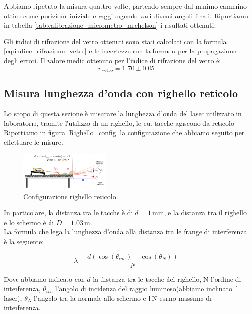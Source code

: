 \documentclass[letterpaper,12pt]{article}
\begin{document}
Abbiamo ripetuto la misura quattro volte, partendo sempre dal minimo cammino ottico come posizione iniziale
e raggiungendo vari diversi angoli finali. Riportiamo in tabella \ref{tab:calibrazione_micrometro_michelson} i risultati ottenuti:


Gli indici di rifrazione del vetro ottenuti sono stati calcolati con la formula \ref{eq:indice_rifrazione_vetro} e le incertezze
con la formula per la propagazione degli errori. Il valore medio ottenuto per l'indice di rifrazione del vetro è:
$$ n_\text{vetro} = 1.70 \pm 0.05$$


\subsection{Misura lunghezza d'onda con righello reticolo}

Lo scopo di questa sezione è misurare la lunghezza d'onda del laser utilizzato in laboratorio, tramite l'utilizzo 
di un righello, le cui tacche agiscono da reticolo. Riportiamo in figura \ref{Righello_config} la configurazione
che abbiamo seguito per effettuare le misure.

\begin{figure}[h!]
    \centering
    \includegraphics[width=0.4\textwidth]{Righello_config.png}
    \caption{Configurazione righello reticolo.}
    \label{fig:Righello_config}
\end{figure}

In particolare, la distanza tra le tacche è di $d = \SI{1}{\milli\meter}$, e la distanza tra il righello e lo 
schermo è di $D = \SI{1.03}{\meter}$.\\
La formula che lega la lunghezza d'onda alla distanza tra le frange di interferenza è la seguente:

\begin{equation}
    \lambda = \frac{d (\cos(\theta_{inc})-\cos(\theta_N))}{N}
    \label{eq:lunghezza_onda}
\end{equation}

Dove abbiamo indicato con $d$ la distanza tra le tacche del righello, N l'ordine di interferenza, $\theta_{inc}$ 
l'angolo di incidenza del raggio luminoso(abbiamo inclinato il laser), $\theta_N$ l'angolo tra la normale allo schermo e l'N-esimo massimo di 
interferenza.\\
\end{document}
